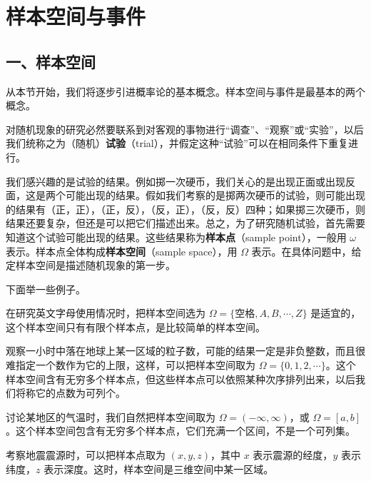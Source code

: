 \documentclass[../../main.tex]{subfiles}
\begin{document}
\section{样本空间与事件}\label{section:ch01-样本空间与事件}

\subsection*{一、样本空间}

从本节开始，我们将逐步引进概率论的基本概念。样本空间与事件是最基本的两个概念。

对随机现象的研究必然要联系到对客观的事物进行“调查”、“观察”或“实验”，以后我们统称之为（随机）\textbf{试验}（trial），并假定这种“试验”可以在相同条件下重复进行。

我们感兴趣的是试验的结果。例如掷一次硬币，我们关心的是出现正面或出现反面，这是两个可能出现的结果。假如我们考察的是掷两次硬币的试验，则可能出现的结果有（正，正），（正，反），（反，正），（反，反）四种；如果掷三次硬币，则结果还要复杂，但还是可以把它们描述出来。总之，为了研究随机试验，首先需要知道这个试验可能出现的结果。这些结果称为\textbf{样本点}（sample point），一般用 $\omega$ 表示。样本点全体构成\textbf{样本空间}（sample space），用 $\Omega$ 表示。在具体问题中，给定样本空间是描述随机现象的第一步。

下面举一些例子。

\begin{example}[英文字母]\label{example:ch01-英文字母}
在研究英文字母使用情况时，把样本空间选为 $\Omega=\{\text{空格},A,B,\cdots,Z\}$ 是适宜的，这个样本空间只有有限个样本点，是比较简单的样本空间。
\end{example}

\begin{example}[粒子数]\label{example:ch01-粒子数}
观察一小时中落在地球上某一区域的粒子数，可能的结果一定是非负整数，而且很难指定一个数作为它的上限，这样，可以把样本空间取为 $\Omega=\{0,1,2,\cdots\}$。这个样本空间含有无穷多个样本点，但这些样本点可以依照某种次序排列出来，以后我们将称它的点数为可列个。
\end{example}

\begin{example}[气温]\label{example:ch01-气温}
讨论某地区的气温时，我们自然把样本空间取为 $\Omega=(-\infty,\infty)$，或 $\Omega=[a,b]$。这个样本空间包含有无穷多个样本点，它们充满一个区间，不是一个可列集。
\end{example}

\begin{example}[震源]\label{example:ch01-震源}
考察地震震源时，可以把样本点取为 $(x,y,z)$，其中 $x$ 表示震源的经度，$y$ 表示纬度，$z$ 表示深度。这时，样本空间是三维空间中某一区域。
\end{example}
\end{document}
